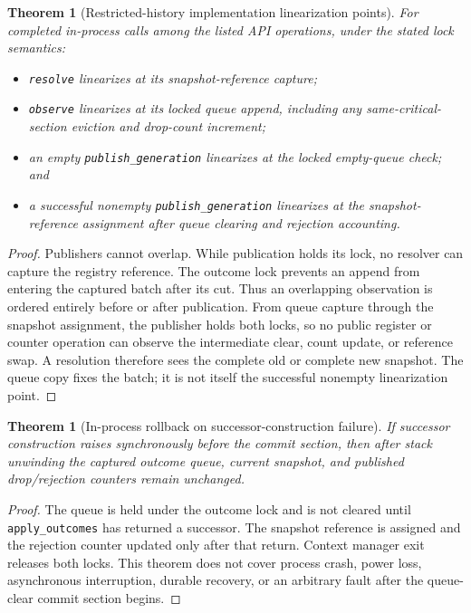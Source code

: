 \documentclass[11pt]{article}
\theoremstyle{definition}
\theoremstyle{plain}
\newtheorem{theorem}[definition]{Theorem}
\begin{document}
\begin{theorem}[Restricted-history implementation linearization points]
\label{thm:linearizable}
For completed in-process calls among the listed API operations, under the
stated lock semantics:
\begin{itemize}[leftmargin=*]
  \item \texttt{resolve} linearizes at its snapshot-reference capture;
  \item \texttt{observe} linearizes at its locked queue append, including any
  same-critical-section eviction and drop-count increment;
  \item an empty \texttt{publish\_generation} linearizes at the locked
  empty-queue check; and
  \item a successful nonempty \texttt{publish\_generation} linearizes at the
  snapshot-reference assignment after queue clearing and rejection accounting.
\end{itemize}
\end{theorem}

\begin{proof}
Publishers cannot overlap.  While publication holds its lock, no resolver can
capture the registry reference.  The outcome lock prevents an append from
entering the captured batch after its cut.  Thus an overlapping observation is
ordered entirely before or after publication.  From queue capture through the
snapshot assignment, the publisher holds both locks, so no public register or
counter operation can observe the intermediate clear, count update, or
reference swap.  A resolution therefore sees the complete old or complete new
snapshot.  The queue copy fixes the batch; it is not itself the successful
nonempty linearization point.
\end{proof}

\begin{theorem}[In-process rollback on successor-construction failure]
\label{thm:exception}
If successor construction raises synchronously before the commit section, then
after stack unwinding the captured outcome queue, current snapshot, and
published drop/rejection counters remain unchanged.
\end{theorem}

\begin{proof}
The queue is held under the outcome lock and is not cleared until
\texttt{apply\_outcomes} has returned a successor.  The snapshot reference is
assigned and the rejection counter updated only after that return.  Context
manager exit releases both locks.  This theorem does not cover process crash,
power loss, asynchronous interruption, durable recovery, or an arbitrary fault
after the queue-clear commit section begins.
\end{proof}
\end{document}

